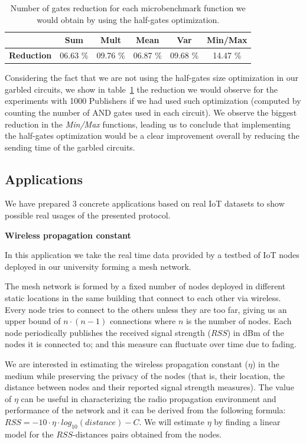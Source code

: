 \begin{table}
    \begin{tabular}{l|*{4}{c}c}
      & \textbf{Sum} & \textbf{Mult} & \textbf{Mean} & \textbf{Var} & \textbf{Min/Max} \\
    \hline
    \textbf{Reduction} & 06.63 \% & 09.76 \% & 06.87 \% & 09.68 \% & 14.47 \% \\
    \end{tabular}
    \caption{Number of gates reduction for each microbenchmark function we
      would obtain by using the half-gates optimization.}
    \label{micro-and}
\end{table}

Considering the fact that we are not using the half-gates size optimization in
our garbled circuits, we show in table~\ref{micro-and} the reduction we would
observe for the experiments with 1000 Publishers if we had used such
optimization (computed by counting the number of AND gates used in each
circuit).  We observe the biggest reduction in the \emph{Min/Max} functions,
leading us to conclude that implementing the half-gates optimization would be a
clear improvement overall by reducing the sending time of the garbled circuits.

\vspace{-4pt}
\subsection{Applications}

We have prepared 3 concrete applications based on real IoT datasets to show
possible real usages of the presented protocol.

\smallskip
\noindent\textbf{Wireless propagation constant}

\noindent In this application we take the real time data provided by a testbed of IoT
nodes deployed in our university forming a mesh network.

The mesh network is formed by a fixed number of nodes deployed in different
static locations in the same building that connect to each other via wireless.
Every node tries to connect to the others unless they are too far, giving us an
upper bound of $n \cdot (n-1)$ connections where $n$ is the number of nodes.
Each node periodically publishes the received signal strength ($RSS$) in dBm of
the nodes it is connected to; and this measure can fluctuate over time due to
fading.

We are interested in estimating the wireless propagation constant ($\eta$) in
the medium while preserving the privacy of the nodes (that is, their location,
the distance between nodes and their reported signal strength measures).
The value of $\eta$ can be useful in characterizing the radio propagation
environment and performance of the network and it can be derived from the
following formula: \mbox{$RSS = -10 \cdot \eta \cdot log_{10}(distance) - C$}.
We will estimate $\eta$ by finding a linear model for the $RSS$-distances pairs
obtained from the nodes.

